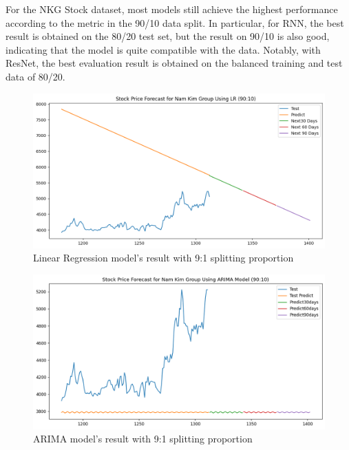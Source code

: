 \documentclass{ieeeojies}
\begin{document}
For the NKG Stock dataset, most models still achieve the highest performance according to the metric in the 90/10 data split. In particular, for RNN, the best result is obtained on the 80/20 test set, but the result on 90/10 is also good, indicating that the model is quite compatible with the data. Notably, with ResNet, the best evaluation result is obtained on the balanced training and test data of 80/20.
\begin{figure}[H]
  \centering
  \begin{minipage}{0.8\linewidth}
    \centering
    \includegraphics[width=\linewidth]{bibliography/LN_NKG_90-10.png}
    \caption{Linear Regression model's result with 9:1 splitting proportion}
    \label{fig22}
  \end{minipage}
\end{figure}
\begin{figure}[H]
  \centering
  \begin{minipage}{0.8\linewidth}
    \centering
    \includegraphics[width=\linewidth]{bibliography/ARIMA_NKG_90-10.png}
    \caption{ARIMA model's result with 9:1 splitting proportion}
    \label{fig23}
  \end{minipage}
\end{figure}
\end{document}

